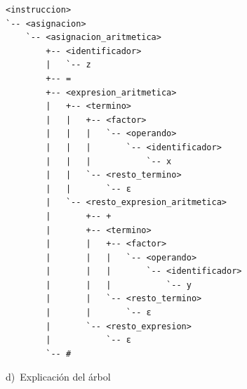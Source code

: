 \documentclass[11pt,letterpaper]{article}
\newcommand{\letra}[2]{\par\medskip\noindent #1)~#2\par\smallskip}
\begin{document}
\begin{lstlisting}
<instruccion>
`-- <asignacion>
    `-- <asignacion_aritmetica>
        +-- <identificador>
        |   `-- z
        +-- =
        +-- <expresion_aritmetica>
        |   +-- <termino>
        |   |   +-- <factor>
        |   |   |   `-- <operando>
        |   |   |       `-- <identificador>
        |   |   |           `-- x
        |   |   `-- <resto_termino>
        |   |       `-- ε
        |   `-- <resto_expresion_aritmetica>
        |       +-- +
        |       +-- <termino>
        |       |   +-- <factor>
        |       |   |   `-- <operando>
        |       |   |       `-- <identificador>
        |       |   |           `-- y
        |       |   `-- <resto_termino>
        |       |       `-- ε
        |       `-- <resto_expresion>
        |           `-- ε
        `-- #
\end{lstlisting}

\letra{d}{Explicación del árbol}
\end{document}
